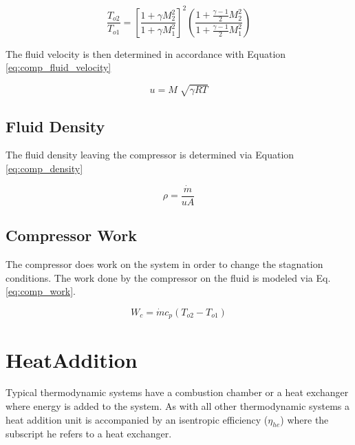 \begin{equation}
\label{eq:com_mach_number}
\frac{T_{o2}}{T_{o1}} = \left[\frac{1 + \gamma M^2_2}{1 + \gamma M^2_1} \right]^2 \left(\frac{1 + \frac{\gamma-1}{2}M^2_2}{1 + \frac{\gamma - 1}{2}M^2_1} \right)
\end{equation}

\noindent The fluid velocity is then determined in accordance with Equation \ref{eq:comp_fluid_velocity}

\begin{equation}
\label{eq:comp_fluid_velocity}
u=M \sqrt[]{\gamma R T}
\end{equation}

\subsection{Fluid Density}
The fluid density leaving the compressor is determined via Equation \ref{eq:comp_density}

\begin{equation}
\label{eq:comp_density}
\rho = \frac{\dot{m}}{uA}
\end{equation}

\subsection{Compressor Work}
The compressor does work on the system in order to change the stagnation conditions.  The work done by the compressor on the fluid
is modeled via Eq. \ref{eq:comp_work}.

\begin{equation}
\label{eq:comp_work}
W_c = \dot{m}c_p\left(T_{o2} - T_{o1}\right)
\end{equation}

\section{HeatAddition}
Typical thermodynamic systems have a combustion chamber or a heat exchanger where energy is added to the system.  As with all other
thermodynamic systems a heat addition unit is accompanied by an isentropic efficiency ($\eta_{he}$) where the subscript he refers to 
a heat exchanger.

